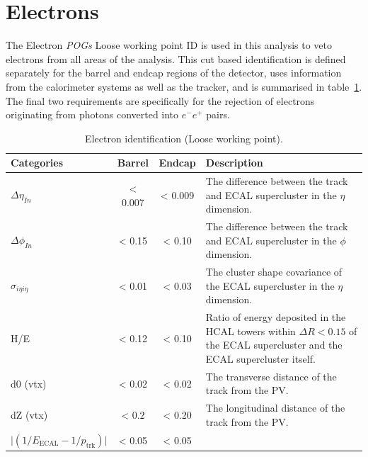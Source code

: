 \section{Electrons}  %
\label{sec:objects_electrons}
The Electron \emph{POGs} Loose working point ID \cite{ref:electronidtwiki} is
used in this analysis to veto 
electrons from all areas of the analysis. This cut based identification is 
defined separately for the barrel and endcap regions of the detector, uses
information
from the calorimeter systems as well as the tracker, and is
summarised in table~\ref{tab:ele-id}. The final two requirements are
specifically for the rejection of electrons originating from photons converted
into $e^-e^+$ pairs.

\begin{table}[t]
  \caption{Electron identification (Loose working point).\label{tab:ele-id}}
  \centering
  \scriptsize
  \begin{tabular}{ lccp{8cm} }
    \hline
    \hline
    Categories                                               & Barrel    &
    Endcap    & 
    Description \\
    \hline
    $\Delta \eta_{In}$                                       & < 0.007     &
    < 0.009     & 
    The difference between the track and ECAL supercluster in the $\eta$ dimension. \\
    $\Delta \phi_{In}$                                       & < 0.15      &
    < 0.10      &
    The difference between the track and ECAL supercluster in the $\phi$ dimension. \\
    $\sigma_{i\eta i\eta}$                                   & < 0.01      &
    < 0.03      & 
    The cluster shape covariance of the ECAL supercluster in the $\eta$ dimension. \\
    H/E                                                      & < 0.12      & < 0.10      &
    Ratio of energy deposited in the HCAL towers within $\Delta R<0.15$ of the ECAL 
    supercluster and the ECAL supercluster itself. \\
    d0 (vtx)                                                 & < 0.02      & < 0.02      &
    The transverse distance of the track from the PV. \\
    dZ (vtx)                                                 & < 0.2       & < 0.20      &
    The longitudinal distance of the track from the PV. \\
    $\lvert(1/E_{\textrm{ECAL}} - 1/p_{\textrm{trk}})\rvert$ & < 0.05      & < 0.05      &

\end{tabular}
\end{table}

